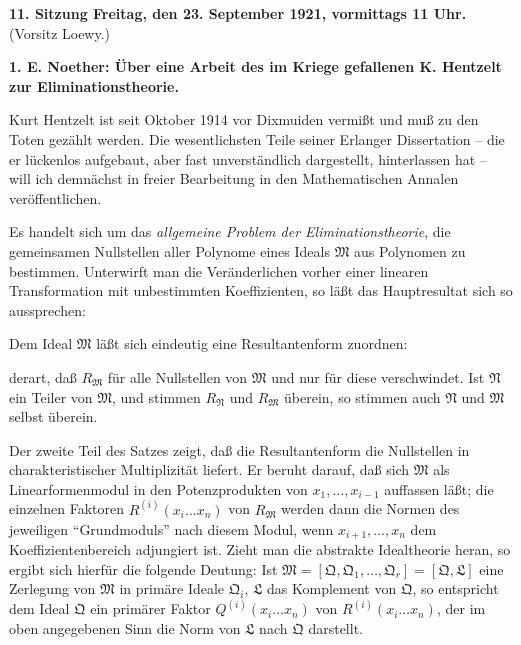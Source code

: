 \begin{center}
\textbf{11. Sitzung Freitag, den 23. September 1921, vormittags 11 Uhr.}\\
(Vorsitz Loewy.)
\end{center}

\begin{center}
\textbf{1. E. Noether: Über eine Arbeit des im Kriege gefallenen K. Hentzelt zur Eliminationstheorie.}
\end{center}

Kurt Hentzelt ist seit Oktober 1914 vor Dixmuiden vermißt und muß zu den Toten gezählt werden. Die wesentlichsten Teile seiner Erlanger Dissertation -- die er lückenlos aufgebaut, aber fast unverständlich dargestellt, hinterlassen hat -- will ich demnächst in freier Bearbeitung in den Mathematischen Annalen veröffentlichen.

Es handelt sich um das \emph{allgemeine Problem der Eliminationstheorie}, die gemeinsamen Nullstellen aller Polynome eines Ideals $\mathfrak M$ aus Polynomen zu bestimmen. Unterwirft man die Veränderlichen vorher einer linearen Transformation mit unbestimmten Koeffizienten, so läßt das Hauptresultat sich so aussprechen:

Dem Ideal $\mathfrak M$ läßt sich eindeutig eine Resultantenform zuordnen:
\par\smallskip
\noindent{}
\par\smallskip\noindent
derart, daß $R_{\mathfrak M}$ für alle Nullstellen von $\mathfrak M$ und nur für diese verschwindet. Ist $\mathfrak N$ ein Teiler von $\mathfrak M$, und stimmen $R_{\mathfrak N}$ und $R_{\mathfrak M}$ überein, so stimmen auch $\mathfrak N$ und $\mathfrak M$ selbst überein.

Der zweite Teil des Satzes zeigt, daß die Resultantenform die Nullstellen in charakteristischer Multiplizität liefert. Er beruht darauf, daß sich $\mathfrak M$ als Linearformenmodul in den Potenzprodukten von $x_1,\ldots,x_{i-1}$ auffassen läßt; die einzelnen Faktoren $R^{(i)}(x_i\ldots x_n)$ von $R_{\mathfrak M}$ werden dann die Normen des jeweiligen ``Grundmoduls'' nach diesem Modul, wenn $x_{i+1},\ldots,x_n$ dem Koeffizientenbereich adjungiert ist. Zieht man die abstrakte Idealtheorie heran, so ergibt sich hierfür die folgende Deutung: Ist $\mathfrak M=[\mathfrak Q,\mathfrak Q_1,\ldots,\mathfrak Q_r]=[\mathfrak Q,\mathfrak L]$ eine Zerlegung von $\mathfrak M$ in primäre Ideale $\mathfrak Q_i$, $\mathfrak L$ das Komplement von $\mathfrak Q$, so entspricht dem Ideal $\mathfrak Q$ ein primärer Faktor $Q^{(i)}(x_i\ldots x_n)$ von $R^{(i)}(x_i\ldots x_n)$, der im oben angegebenen Sinn die Norm von $\mathfrak L$ nach $\mathfrak Q$ darstellt.

